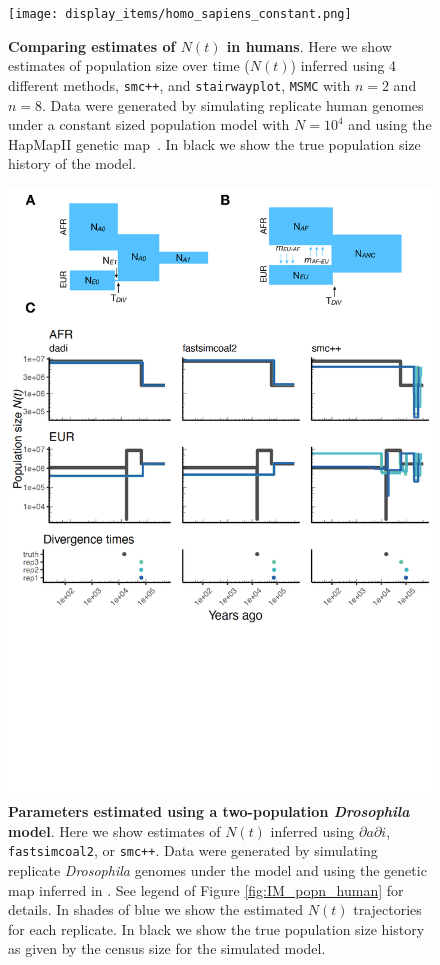 \documentclass[12pt,halfline,a4paper]{ouparticle}
\newcommand{\dadi}{$\partial a \partial i$\xspace}
\newcommand{\MSMC}{\texttt{MSMC}\xspace}
\newcommand{\smcpp}{\texttt{smc++}\xspace}
\newcommand{\fastsimcoal}{\texttt{fastsimcoal2}\xspace}
\begin{document}
\begin{figure}
\begin{center}
\texttt{[image: display\_items/homo\_sapiens\_constant.png]}
\caption{\textbf{Comparing estimates of $N(t)$ in humans}. Here we show estimates of population
size over time ($N(t)$) inferred using 4 different methods, \smcpp, and \texttt{stairwayplot},
\MSMC with $n=2$ and $n=8$. Data were generated by simulating
replicate human genomes under a constant sized population model with $N=10^4$ and using the
HapMapII genetic map~\citep{international2007second}. In black we show the true population size history
of the model.}
\label{fig:n_t_HomSap_constant}
\end{center}
\end{figure}


\begin{figure}
\begin{center}
\includegraphics[width=0.8\linewidth]{display_items/d_mel_two_popn_comp.pdf}
\caption{\textbf{Parameters estimated using a two-population \emph{Drosophila} model}.
Here we show estimates of $N(t)$ inferred using \dadi, \fastsimcoal, or \smcpp.
Data were generated by simulating
replicate \emph{Drosophila} genomes under the \cite{li2006inferring} model and using the genetic map
inferred in \cite{comeron2012many}. See legend of Figure \ref{fig:IM_popn_human} for details.
In shades of blue we show the estimated
$N(t)$ trajectories for each replicate. In black we show the true population size history
as given by the census size for the simulated model.}
\label{fig:two_popn_fly}
\end{center}
\end{figure}
\end{document}
